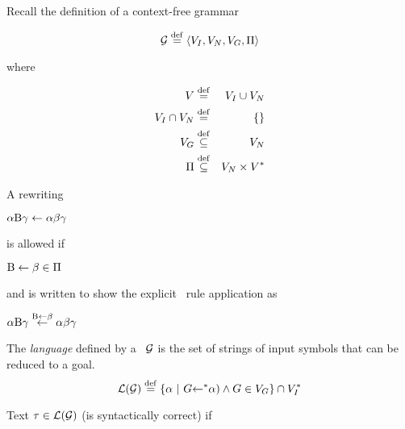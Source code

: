 






\vspace{1em}

Recall the definition of a context-free grammar

\begin{center}
\begin{equation}
{\cal G} \stackrel{\rm def}{=} \langle V_I, V_N, V_G, \Pi\rangle
\end{equation}
\end{center}

\noindent where

\begin{eqnarray*}
     V                &\stackrel{\rm def}{=}& V_I \cup V_N         \\
     V_I \cap V_N     &\stackrel{\rm def}{=}& \{\}				 \\
     V_G	      &\stackrel{\rm def}{\subseteq}& V_N			     \\
     \Pi	      &\stackrel{\rm def}{\subseteq}& V_N\times V^*
\end{eqnarray*}

A rewriting

\begin{center}
$\alpha{\rm B}\gamma\leftarrow\alpha\beta\gamma$
\end{center}

\noindent is allowed if

\begin{center}
${\rm B} \leftarrow \beta \in \Pi$
\end{center}

\noindent and is written to show the explicit \cfg\ rule application as

\begin{center}
$\alpha{\rm B}\gamma\stackrel{{\rm B} \leftarrow \beta}{\leftarrow}\alpha\beta\gamma$
\end{center}

The {\em language} defined by a \cfg\ $\cal G$ is the 
set of strings of input symbols that can be reduced to a goal.
\begin{displaymath}
{\cal L(G)}  \stackrel{\rm def}{=}
	\{\alpha\ |\ G\mbox{$\leftarrow$}^*\alpha) \wedge G \in V_G\} \cap V_I^*
\end{displaymath}


Text $\tau \in {\cal L}({\cal G})$ (is syntactically correct) if


